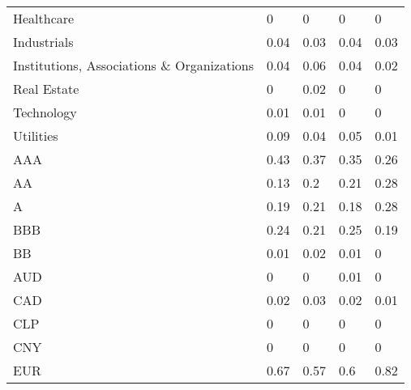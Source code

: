 \begin{table}[H]
\begin{tabular}{lllll}
Healthcare & \cellcolor[HTML]{FCFCFF}0 & \cellcolor[HTML]{FCFCFF}0 & \cellcolor[HTML]{FCFCFF}0 & \cellcolor[HTML]{FCFCFF}0 \\
Industrials & \cellcolor[HTML]{F5FAF9}0.04 & \cellcolor[HTML]{F7FAFB}0.03 & \cellcolor[HTML]{F5FAF9}0.04 & \cellcolor[HTML]{F7FAFB}0.03 \\
Institutions,   Associations \& Organizations & \cellcolor[HTML]{F5FAF9}0.04 & \cellcolor[HTML]{F2F8F6}0.06 & \cellcolor[HTML]{F5FAF9}0.04 & \cellcolor[HTML]{F9FBFC}0.02 \\
Real Estate & \cellcolor[HTML]{FCFCFF}0 & \cellcolor[HTML]{F9FBFC}0.02 & \cellcolor[HTML]{FCFCFF}0 & \cellcolor[HTML]{FCFCFF}0 \\
Technology & \cellcolor[HTML]{FBFCFE}0.01 & \cellcolor[HTML]{FBFCFE}0.01 & \cellcolor[HTML]{FCFCFF}0 & \cellcolor[HTML]{FCFCFF}0 \\
Utilities & \cellcolor[HTML]{ECF6F2}0.09 & \cellcolor[HTML]{F5FAF9}0.04 & \cellcolor[HTML]{F4F9F8}0.05 & \cellcolor[HTML]{FBFCFE}0.01 \\
AAA & \cellcolor[HTML]{B0DDBD}0.43 & \cellcolor[HTML]{BBE2C7}0.37 & \cellcolor[HTML]{BEE3CA}0.35 & \cellcolor[HTML]{CEEAD8}0.26 \\
AA & \cellcolor[HTML]{E5F3EC}0.13 & \cellcolor[HTML]{D9EEE1}0.2 & \cellcolor[HTML]{D7EDDF}0.21 & \cellcolor[HTML]{CBE8D5}0.28 \\
A & \cellcolor[HTML]{DBEFE2}0.19 & \cellcolor[HTML]{D7EDDF}0.21 & \cellcolor[HTML]{DCF0E4}0.18 & \cellcolor[HTML]{CBE8D5}0.28 \\
BBB & \cellcolor[HTML]{D2EBDB}0.24 & \cellcolor[HTML]{D7EDDF}0.21 & \cellcolor[HTML]{D0EAD9}0.25 & \cellcolor[HTML]{DBEFE2}0.19 \\
BB & \cellcolor[HTML]{FBFCFE}0.01 & \cellcolor[HTML]{F9FBFC}0.02 & \cellcolor[HTML]{FBFCFE}0.01 & \cellcolor[HTML]{FCFCFF}0 \\
AUD & \cellcolor[HTML]{FCFCFF}0 & \cellcolor[HTML]{FCFCFF}0 & \cellcolor[HTML]{FBFCFE}0.01 & \cellcolor[HTML]{FCFCFF}0 \\
CAD & \cellcolor[HTML]{F9FBFC}0.02 & \cellcolor[HTML]{F7FAFB}0.03 & \cellcolor[HTML]{F9FBFC}0.02 & \cellcolor[HTML]{FBFCFE}0.01 \\
CLP & \cellcolor[HTML]{FCFCFF}0 & \cellcolor[HTML]{FCFCFF}0 & \cellcolor[HTML]{FCFCFF}0 & \cellcolor[HTML]{FCFCFF}0 \\
CNY & \cellcolor[HTML]{FCFCFF}0 & \cellcolor[HTML]{FCFCFF}0 & \cellcolor[HTML]{FCFCFF}0 & \cellcolor[HTML]{FCFCFF}0 \\
EUR & \cellcolor[HTML]{85CC99}0.67 & \cellcolor[HTML]{97D3A8}0.57 & \cellcolor[HTML]{92D1A3}0.6 & \cellcolor[HTML]{6BC182}0.82 \\

\end{tabular}
\end{table}
